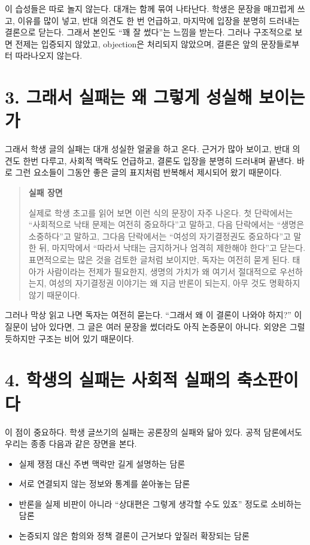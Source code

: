 이 습성들은 따로 놀지 않는다. 대개는 함께 묶여 나타난다. 학생은 문장을 매끄럽게 쓰고, 이유를 많이 넣고, 반대 의견도 한 번 언급하고, 마지막에 입장을 분명히 드러내는 결론으로 닫는다. 그래서 본인도 ``꽤 잘 썼다''는 느낌을 받는다. 그러나 구조적으로 보면 전제는 입증되지 않았고, objection은 처리되지 않았으며, 결론은 앞의 문장들로부터 따라나오지 않는다.

\section{3. 그래서 실패는 왜 그렇게 성실해 보이는가}\label{3-uxadf8uxb798uxc11c-uxc2e4uxd328uxb294-uxc65c-uxadf8uxb807uxac8c-uxc131uxc2e4uxd574-uxbcf4uxc774uxb294uxac00}

그래서 학생 글의 실패는 대개 성실한 얼굴을 하고 온다. 근거가 많아 보이고, 반대 의견도 한번 다루고, 사회적 맥락도 언급하고, 결론도 입장을 분명히 드러내며 끝낸다. 바로 그런 요소들이 그동안 좋은 글의 표지처럼 반복해서 제시되어 왔기 때문이다.

\begin{quote}
\textbf{실패 장면}

실제로 학생 초고를 읽어 보면 이런 식의 문장이 자주 나온다. 첫 단락에서는 ``사회적으로 낙태 문제는 여전히 중요하다''고 말하고, 다음 단락에서는 ``생명은 소중하다''고 말하고, 그다음 단락에서는 ``여성의 자기결정권도 중요하다''고 말한 뒤, 마지막에서 ``따라서 낙태는 금지하거나 엄격히 제한해야 한다''고 닫는다. 표면적으로는 많은 것을 검토한 글처럼 보이지만, 독자는 여전히 묻게 된다. 태아가 사람이라는 전제가 필요한지, 생명의 가치가 왜 여기서 절대적으로 우선하는지, 여성의 자기결정권 이야기는 왜 지금 반론이 되는지, 아무 것도 명확하지 않기 때문이다.
\end{quote}

그러나 막상 읽고 나면 독자는 여전히 묻는다. ``그래서 왜 이 결론이 나와야 하지?'' 이 질문이 남아 있다면, 그 글은 여러 문장을 썼더라도 아직 논증문이 아니다. 외양은 그럴듯하지만 구조는 비어 있기 때문이다.

\section{4. 학생의 실패는 사회적 실패의 축소판이다}\label{4-uxd559uxc0dduxc758-uxc2e4uxd328uxb294-uxc0acuxd68cuxc801-uxc2e4uxd328uxc758-uxcd95uxc18cuxd310uxc774uxb2e4}

이 점이 중요하다. 학생 글쓰기의 실패는 공론장의 실패와 닮아 있다. 공적 담론에서도 우리는 종종 다음과 같은 장면을 본다.

\begin{itemize}
\tightlist
\item
  실제 쟁점 대신 주변 맥락만 길게 설명하는 담론
\item
  서로 연결되지 않는 정보와 통계를 쏟아놓는 담론
\item
  반론을 실제 비판이 아니라 ``상대편은 그렇게 생각할 수도 있죠'' 정도로 소비하는 담론
\item
  논증되지 않은 함의와 정책 결론이 근거보다 앞질러 확장되는 담론
\end{itemize}

